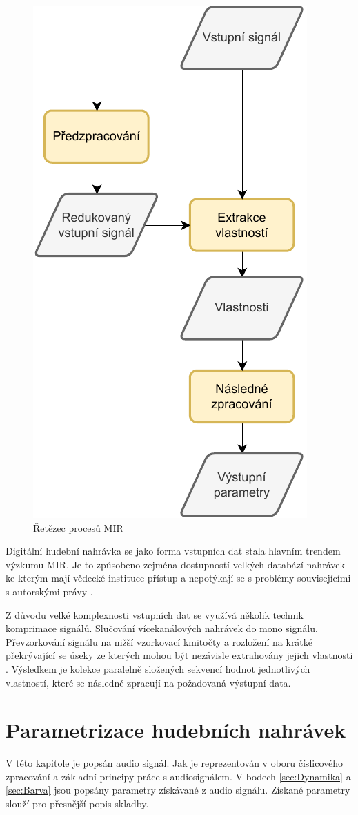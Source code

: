 \begin{figure}[H]
    \centering
    \includegraphics[width = 0.4\linewidth]{obrazky/MIR-diagram.pdf}
    \caption{Řetězec procesů MIR \cite{a_new_companion_to_digital_humanities}}
    \label{fig:MIR_diagram}
\end{figure}

    Digitální hudební nahrávka se jako forma vstupních dat stala hlavním trendem výzkumu \acs{MIR}.
    Je to způsobeno zejména dostupností velkých databází nahrávek ke kterým mají vědecké instituce přístup a nepotýkají se s problémy souvisejícími s autorskými právy \cite{a_new_companion_to_digital_humanities}.

    Z důvodu velké komplexnosti vstupních dat se využívá několik technik komprimace signálů. 
    Slučování vícekanálových nahrávek do mono signálu. Převzorkování signálu na nižší vzorkovací kmitočty
    a rozložení na krátké překrývající se úseky ze kterých mohou být nezávisle extrahovány jejich vlastnosti \cite{lidy09:448[TUW-181186]}. 
    Výsledkem je kolekce paralelně složených sekvencí hodnot jednotlivých vlastností, které se následně zpracují na požadovaná výstupní data.

  \section{Parametrizace hudebních nahrávek} \label{sec:Parametrizace}
  V této kapitole je popsán audio signál. Jak je reprezentován v oboru číslicového zpracování a základní principy práce s audiosignálem.
  V bodech \ref{sec:Dynamika} a \ref{sec:Barva} jsou popsány parametry získávané z audio signálu.
  Získané parametry slouží pro přesnější popis skladby.

